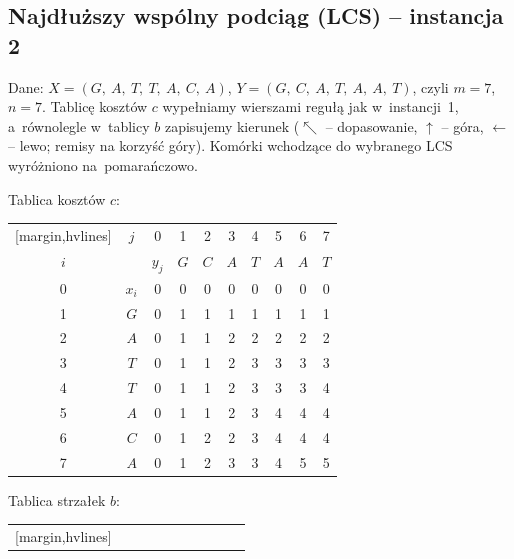 \subsection{Najdłuższy wspólny podciąg (LCS) -- instancja 2}

Dane: $X = (G,\ A,\ T,\ T,\ A,\ C,\ A)$, $Y = (G,\ C,\ A,\ T,\ A,\ A,\ T)$, czyli
$m = 7$, $n = 7$. Tablicę kosztów $c$ wypełniamy wierszami regułą jak w~instancji~1,
a~równolegle w~tablicy $b$ zapisujemy kierunek ($\nwarrow$ -- dopasowanie,
$\uparrow$ -- góra, $\leftarrow$ -- lewo; remisy na korzyść góry). Komórki
wchodzące do wybranego LCS wyróżniono na~\textcolor{accentB}{pomarańczowo}.

\begin{aztable}
	\centering
	\renewcommand{\arraystretch}{1.2}
	\begin{minipage}{0.48\linewidth}
		\centering
		Tablica kosztów $c$: \\[0.5em]
		\begin{NiceTabular}{cc|c|ccccccc}[margin,hvlines]
			    & $j$   & 0     & 1   & 2   & 3   & 4   & 5   & 6   & 7   \\
			$i$ &       & $y_j$ & $G$ & $C$ & $A$ & $T$ & $A$ & $A$ & $T$ \\
			   & $x_i$ & 0     & 0   & 0   & 0   & 0   & 0   & 0   & 0   \\
			1   & $G$   & 0     & \color{accentB}1 & 1 & 1 & 1 & 1 & 1 & 1 \\
			2   & $A$   & 0     & 1   & 1   & \color{accentB}2 & 2 & 2 & 2 & 2 \\
			3   & $T$   & 0     & 1   & 1   & 2   & 3   & 3   & 3   & 3   \\
			4   & $T$   & 0     & 1   & 1   & 2   & \color{accentB}3 & 3 & 3 & 4 \\
			5   & $A$   & 0     & 1   & 1   & 2   & 3   & \color{accentB}4 & 4 & 4 \\
			6   & $C$   & 0     & 1   & 2   & 2   & 3   & 4   & 4   & 4   \\
			7   & $A$   & 0     & 1   & 2   & 3   & 3   & 4   & \color{accentB}5 & 5 \\
		\end{NiceTabular}
	\end{minipage}\hfill
	\begin{minipage}{0.48\linewidth}
		\centering
		Tablica strzałek $b$: \\[0.5em]
		\begin{NiceTabular}{cc|c|ccccccc}[margin,hvlines]

\end{NiceTabular}
\end{minipage}
\end{aztable}
